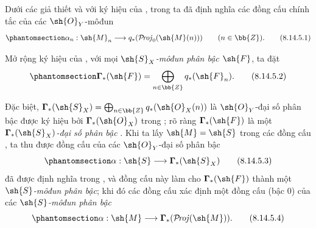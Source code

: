 \documentclass[oneside,10pt]{amsart}
\makeatletter
\newcommand{\ega@arrow}[2]{\mathchoice{#1}{#2}{#2}{#2}}
\renewcommand{\to}{\ega@arrow{\longrightarrow}{\rightarrow}}
\def\shProj{\mathcal{P}\!\mathit{roj}}
\newcommand{\oldpage}[2][]{\marginnote{\normalfont\footnotesize\textbf{#1}~|~#2}\ignorespaces}
\let\EGAOriginalLabel\label
\renewcommand{\label}[1]{\phantomsection\EGAOriginalLabel{#1}}
\makeatother
\begin{document}
\begin{env}[8.14.5]
\label{II.8.14.5}
Dưới các giả thiết và với ký hiệu của , trong  ta đã định nghĩa các đồng cấu chính tắc của các $\sh{O}_Y$-môđun
\[
\label{II.8.14.5.1}
    \alpha_n: \sh{M}_n \to q_*(\shProj_0(\sh{M}(n)))
    \qquad (n\in\bb{Z}).
\tag{8.14.5.1}
\]

Mở rộng ký hiệu của , với mọi \emph{$\sh{S}_X$-môđun phân bậc $\sh{F}$}, ta đặt
\[
\label{II.8.14.5.2}
    \boldsymbol{\Gamma}_*(\sh{F}) = \bigoplus_{n\in\bb{Z}}q_*(\sh{F}_n).
\tag{8.14.5.2}
\]

Đặc biệt, $\boldsymbol{\Gamma}_*(\sh{S}_X)=\bigoplus_{n\in\bb{Z}}q_*(\sh{O}_X(n))$ là $\sh{O}_Y$-đại số phân bậc được ký hiệu bởi $\boldsymbol{\Gamma}_*(\sh{O}_X)$ trong ;
rõ ràng $\boldsymbol{\Gamma}_*(\sh{F})$ là một \emph{$\boldsymbol{\Gamma}_*(\sh{S}_X)$-đại số phân bậc} .
Khi
\oldpage[II]{199}
ta lấy $\sh{M}=\sh{S}$ trong các đồng cấu , ta thu được đồng cấu của các $\sh{O}_Y$-đại số phân bậc
\[
\label{II.8.14.5.3}
    \alpha:\sh{S}\to\boldsymbol{\Gamma}_*(\sh{S}_X)
\tag{8.14.5.3}
\]
đã được định nghĩa trong , và đồng cấu này làm cho $\boldsymbol{\Gamma}_*(\sh{F})$ thành một \emph{$\sh{S}$-môđun phân bậc};
khi đó các đồng cấu  xác định một đồng cấu (bậc $0$) của các \emph{$\sh{S}$-môđun phân bậc}
\[
\label{II.8.14.5.4}
    \alpha:\sh{M}\to\boldsymbol{\Gamma}_*(\shProj(\sh{M})).
\tag{8.14.5.4}
\]
\end{env}
\end{document}
